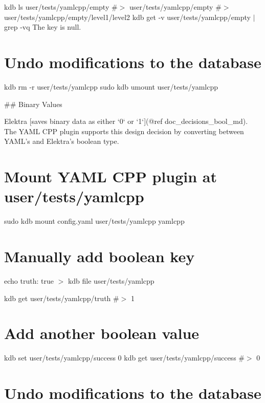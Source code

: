 kdb ls user/tests/yamlcpp/empty \#$>$ user/tests/yamlcpp/empty \#$>$ user/tests/yamlcpp/empty/level1/level2 kdb get -\/v user/tests/yamlcpp/empty $\vert$ grep -\/vq \textquotesingle{}The key is null.\textquotesingle{}

\section*{Undo modifications to the database}

kdb rm -\/r user/tests/yamlcpp sudo kdb umount user/tests/yamlcpp 
\begin{DoxyCode}
## Binary Values

Elektra [saves binary data as either `0` or `1`](@ref doc\_decisions\_bool\_md). The YAML CPP plugin supports
       this design decision by converting between YAML’s and Elektra’s boolean type.
\end{DoxyCode}
 \section*{Mount Y\+A\+ML C\+PP plugin at {\ttfamily user/tests/yamlcpp}}

sudo kdb mount config.\+yaml user/tests/yamlcpp yamlcpp \section*{Manually add boolean key}

echo \textquotesingle{}truth\+: true\textquotesingle{} $>$ {\ttfamily kdb file user/tests/yamlcpp}

kdb get user/tests/yamlcpp/truth \#$>$ 1

\section*{Add another boolean value}

kdb set user/tests/yamlcpp/success 0 kdb get user/tests/yamlcpp/success \#$>$ 0

\section*{Undo modifications to the database}

